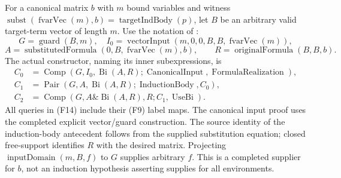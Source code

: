For a canonical matrix $b$ with $m$ bound variables and witness
$\operatorname{subst}(\operatorname{fvarVec}(m),b)
 =\operatorname{targetIndBody}(p)$, let $B$ be an arbitrary valid
target-term vector of length $m$.  Use the notation of
:
\[
 G=\operatorname{guard}(B,m),\quad
 I_0=\operatorname{vectorInput}(m,0,0,B,B,\operatorname{fvarVec}(m)),
\]
\[
 A=\operatorname{substitutedFormula}(0,B,\operatorname{fvarVec}(m),b),
 \qquad R=\operatorname{originalFormula}(B,B,b).
\]
The actual constructor, naming its inner subexpressions, is
\begin{align*}
 C_0&=\operatorname{Comp}(G,I_0,\operatorname{Bi}(A,R);
                 \operatorname{CanonicalInput},\operatorname{FormulaRealization}),\\
 C_1&=\operatorname{Pair}(G,A,\operatorname{Bi}(A,R);
                 \operatorname{InductionBody},C_0),\\
 C_2&=\operatorname{Comp}(G,A\mathbin\&\operatorname{Bi}(A,R),R;
                 C_1,\operatorname{UseBi}).
 \tag{F14}
\end{align*}
All queries in (F14) include their (F9) label maps.  The canonical
input proof uses the completed explicit vector/guard construction.
The source identity of the induction-body antecedent follows from
the supplied substitution equation; closed free-support identifies
$R$ with the desired matrix.  Projecting
$\operatorname{inputDomain}(m,B,f)$ to $G$ supplies arbitrary $f$.
This is a completed supplier for $b$, not an induction hypothesis
asserting supplies for all environments.

